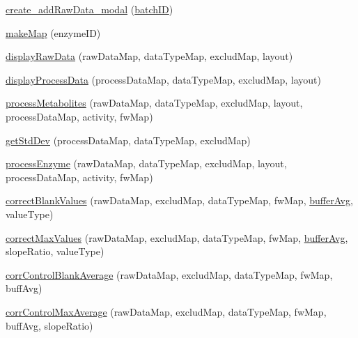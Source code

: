 \begin{DoxyCompactItemize}
\item 
\hyperlink{obsolete_2processing__bak_8php_a893fcb448b99525d8aaf3874c4e681b4}{create\-\_\-add\-Raw\-Data\-\_\-modal} (\hyperlink{obsolete_2processing__bak_8php_a88c5bc4262b7c34f236357f5c53fc99b}{batch\-I\-D})
\item 
\hyperlink{obsolete_2processing__bak_8php_a45193cc86b5e0fa2a825974b0a33bea1}{make\-Map} (enzyme\-I\-D)
\item 
\hyperlink{obsolete_2processing__bak_8php_ae5265e630c1078e1d9f56fa730a5c5f1}{display\-Raw\-Data} (raw\-Data\-Map, data\-Type\-Map, exclud\-Map, layout)
\item 
\hyperlink{obsolete_2processing__bak_8php_af689d74b46e91478e9a44c3b36410c41}{display\-Process\-Data} (process\-Data\-Map, data\-Type\-Map, exclud\-Map, layout)
\item 
\hyperlink{obsolete_2processing__bak_8php_a9285c7ba04922c3a1f2898d1a5ab448d}{process\-Metabolites} (raw\-Data\-Map, data\-Type\-Map, exclud\-Map, layout, process\-Data\-Map, activity, fw\-Map)
\item 
\hyperlink{obsolete_2processing__bak_8php_a3cd4d96d342a4cc8e367b0707c7651f4}{get\-Std\-Dev} (process\-Data\-Map, data\-Type\-Map, exclud\-Map)
\item 
\hyperlink{obsolete_2processing__bak_8php_a49b78109d6c8eade3119bcf1f9dfd251}{process\-Enzyme} (raw\-Data\-Map, data\-Type\-Map, exclud\-Map, layout, process\-Data\-Map, activity, fw\-Map)
\item 
\hyperlink{obsolete_2processing__bak_8php_a720e09af96e0e78054ac8b5ce42777fb}{correct\-Blank\-Values} (raw\-Data\-Map, exclud\-Map, data\-Type\-Map, fw\-Map, \hyperlink{obsolete_2processing__bak_8php_add23382310b9fc9672ec70ac21671322}{buffer\-Avg}, value\-Type)
\item 
\hyperlink{obsolete_2processing__bak_8php_a10671a992cd140299cc0377ca13abbba}{correct\-Max\-Values} (raw\-Data\-Map, exclud\-Map, data\-Type\-Map, fw\-Map, \hyperlink{obsolete_2processing__bak_8php_add23382310b9fc9672ec70ac21671322}{buffer\-Avg}, slope\-Ratio, value\-Type)
\item 
\hyperlink{obsolete_2processing__bak_8php_a84838f44b24ad0c72225c146d21414e2}{corr\-Control\-Blank\-Average} (raw\-Data\-Map, exclud\-Map, data\-Type\-Map, fw\-Map, buff\-Avg)
\item 
\hyperlink{obsolete_2processing__bak_8php_af5e03b9a093c14ea308e54c1dd41e6d1}{corr\-Control\-Max\-Average} (raw\-Data\-Map, exclud\-Map, data\-Type\-Map, fw\-Map, buff\-Avg, slope\-Ratio)
\item 

\end{DoxyCompactItemize}
